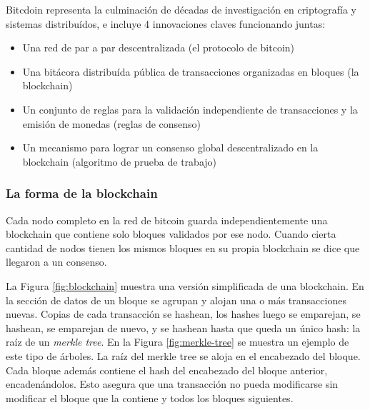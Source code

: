 
Bitcdoin representa la culminación de décadas de investigación en criptografía
y sistemas distribuídos, e incluye 4 innovaciones claves funcionando juntas:
\begin{itemize}
  \item Una red de par a par descentralizada (el protocolo de bitcoin)
  \item Una bitácora distribuída pública de transacciones organizadas en bloques (la blockchain)
  \item Un conjunto de reglas para la validación independiente de transacciones y la emisión de monedas (reglas de consenso)
  \item Un mecanismo para lograr un consenso global descentralizado en la blockchain (algoritmo de prueba de trabajo)
\end{itemize}

\subsubsection{La forma de la blockchain}

Cada nodo completo en la red de bitcoin guarda independientemente una blockchain que contiene solo
bloques validados por ese nodo. Cuando cierta cantidad de nodos tienen los mismos bloques en su propia blockchain
se dice que llegaron a un consenso. 

La Figura \ref{fig:blockchain} muestra una versión simplificada de una blockchain. En la sección de datos de un bloque
se agrupan y alojan una o más transacciones nuevas. Copias de cada transacción se hashean, los hashes luego
se emparejan, se hashean, se emparejan de nuevo, y se hashean hasta que queda un único hash: la raíz de un
\textit{merkle tree}. En la Figura \ref{fig:merkle-tree} se muestra un ejemplo de este tipo de árboles.
La raíz del merkle tree se aloja en el encabezado del bloque. Cada bloque además contiene el hash del encabezado
del bloque anterior, encadenándolos. Esto asegura que una transacción no pueda modificarse sin modificar el bloque
que la contiene y todos los bloques siguientes.

